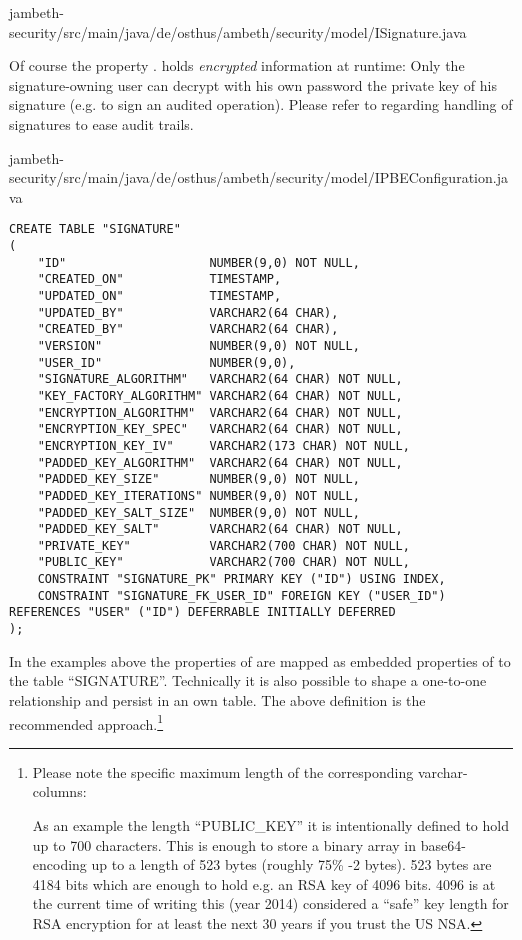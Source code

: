 	{jambeth-security/src/main/java/de/osthus/ambeth/security/model/ISignature.java}

Of course the property . holds \emph{encrypted} information at runtime: Only the signature-owning user can decrypt with his own password the private key of his signature (e.g. to sign an audited operation). Please refer to  regarding handling of signatures to ease audit trails.

	{jambeth-security/src/main/java/de/osthus/ambeth/security/model/IPBEConfiguration.java}

\begin{lstlisting}[style=SQL-Oracle,caption={Example schema definition to persist the \AMBETH{} \type{ISignature}-entity (Oracle SQL)}]
CREATE TABLE "SIGNATURE"
(	
	"ID"         			NUMBER(9,0) NOT NULL,
	"CREATED_ON" 			TIMESTAMP,
	"UPDATED_ON" 			TIMESTAMP,
	"UPDATED_BY" 			VARCHAR2(64 CHAR),
	"CREATED_BY" 			VARCHAR2(64 CHAR),
	"VERSION"    			NUMBER(9,0) NOT NULL,
	"USER_ID"				NUMBER(9,0),
	"SIGNATURE_ALGORITHM"	VARCHAR2(64 CHAR) NOT NULL,
	"KEY_FACTORY_ALGORITHM"	VARCHAR2(64 CHAR) NOT NULL,
	"ENCRYPTION_ALGORITHM"	VARCHAR2(64 CHAR) NOT NULL,
	"ENCRYPTION_KEY_SPEC"	VARCHAR2(64 CHAR) NOT NULL,
	"ENCRYPTION_KEY_IV"		VARCHAR2(173 CHAR) NOT NULL,
	"PADDED_KEY_ALGORITHM"	VARCHAR2(64 CHAR) NOT NULL,
	"PADDED_KEY_SIZE"		NUMBER(9,0) NOT NULL,
	"PADDED_KEY_ITERATIONS"	NUMBER(9,0) NOT NULL,
	"PADDED_KEY_SALT_SIZE"	NUMBER(9,0) NOT NULL,
	"PADDED_KEY_SALT"		VARCHAR2(64 CHAR) NOT NULL,
	"PRIVATE_KEY"			VARCHAR2(700 CHAR) NOT NULL,
	"PUBLIC_KEY"			VARCHAR2(700 CHAR) NOT NULL,
	CONSTRAINT "SIGNATURE_PK" PRIMARY KEY ("ID") USING INDEX,
	CONSTRAINT "SIGNATURE_FK_USER_ID" FOREIGN KEY ("USER_ID") REFERENCES "USER" ("ID") DEFERRABLE INITIALLY DEFERRED
);
\end{lstlisting}
In the examples above the properties of  are mapped as embedded properties of  to the table ``SIGNATURE''. Technically it is also possible to shape a one-to-one relationship and persist  in an own table. The above definition is the recommended approach.\footnote{Please note the specific maximum length of the corresponding varchar-columns:\newline

As an example the length ``PUBLIC\_KEY'' it is intentionally defined to hold up to 700 characters. This is enough to store a binary array in base64-encoding up to a length of 523 bytes (roughly 75\% -2 bytes). 523 bytes are 4184 bits which are enough to hold e.g. an RSA key of 4096 bits. 4096 is at the current time of writing this (year 2014) considered a ``safe'' key length for RSA encryption for at least the next 30 years if you trust the US NSA\cite{nsa01}.}\newline



